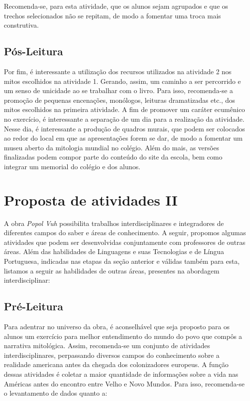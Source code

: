 \documentclass[12pt]{extarticle}
\begin{document}
Recomenda-se, para esta atividade, que os alunos sejam agrupados e que
os trechos selecionados não se repitam, de modo a fomentar uma troca
mais construtiva.

\subsection{Pós-Leitura}

Por fim, é interessante a utilização dos recursos utilizados
na atividade 2 nos mitos escolhidos na atividade 1. Gerando, assim, um
caminho a ser percorrido e um senso de unicidade ao se trabalhar com o
livro. Para isso, recomenda-se a promoção de pequenas encenações,
monólogos, leituras dramatizadas etc., dos mitos escolhidos na primeira
atividade. A fim de promover um caráter ecumênico no exercício, é
interessante a separação de um dia para a realização da atividade. Nesse
dia, é interessante a produção de quadros murais, que podem ser
colocados ao redor do local em que as apresentações forem se dar, de
modo a fomentar um museu aberto da mitologia mundial no colégio. Além do
mais, as versões finalizadas podem compor parte do conteúdo do site da
escola, bem como integrar um memorial do colégio e dos alunos.

\section{Proposta de atividades II}

A obra \emph{Popol Vuh} possibilita trabalhos interdisciplinares e
integradores de diferentes campos do saber e áreas de conhecimento. A
seguir, propomos algumas atividades que podem ser desenvolvidas
conjuntamente com professores de outras áreas. Além das habilidades de
Linguagens e suas Tecnologias e de Língua Portuguesa, indicadas nas
etapas da seção anterior e válidas também para esta, listamos a seguir
as habilidades de outras áreas, presentes na abordagem interdisciplinar:


\subsection{Pré-Leitura}

Para adentrar no universo da obra, é aconselhável que seja
proposto para os alunos um exercício para melhor entendimento do mundo
do povo que compôs a narrativa mitológica. Assim, recomenda-se um
conjunto de atividades interdisciplinares, perpassando diversos campos
do conhecimento sobre a realidade americana antes da chegada dos
colonizadores europeus. A função dessas atividades é coletar a maior
quantidade de informações sobre a vida nas Américas antes do encontro
entre Velho e Novo Mundos. Para isso, recomenda-se o levantamento de
dados quanto a:
\end{document}
